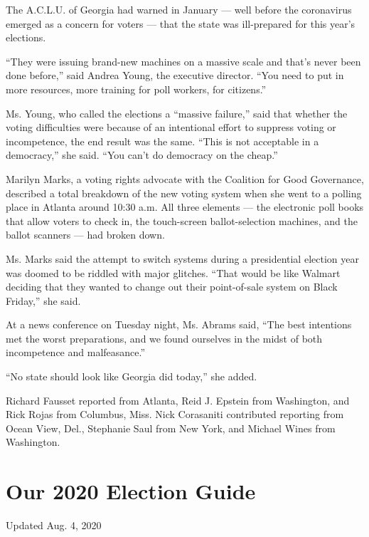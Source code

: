 The A.C.L.U. of Georgia had warned in January --- well before the
coronavirus emerged as a concern for voters --- that the state was
ill-prepared for this year's elections.

``They were issuing brand-new machines on a massive scale and that's
never been done before,'' said Andrea Young, the executive director.
``You need to put in more resources, more training for poll workers, for
citizens.''

Ms. Young, who called the elections a ``massive failure,'' said that
whether the voting difficulties were because of an intentional effort to
suppress voting or incompetence, the end result was the same. ``This is
not acceptable in a democracy,'' she said. ``You can't do democracy on
the cheap.''

Marilyn Marks, a voting rights advocate with the Coalition for Good
Governance, described a total breakdown of the new voting system when
she went to a polling place in Atlanta around 10:30 a.m. All three
elements --- the electronic poll books that allow voters to check in,
the touch-screen ballot-selection machines, and the ballot scanners ---
had broken down.

Ms. Marks said the attempt to switch systems during a presidential
election year was doomed to be riddled with major glitches. ``That would
be like Walmart deciding that they wanted to change out their
point-of-sale system on Black Friday,'' she said.

At a news conference on Tuesday night, Ms. Abrams said, ``The best
intentions met the worst preparations, and we found ourselves in the
midst of both incompetence and malfeasance.''

``No state should look like Georgia did today,'' she added.

Richard Fausset reported from Atlanta, Reid J. Epstein from Washington,
and Rick Rojas from Columbus, Miss. Nick Corasaniti contributed
reporting from Ocean View, Del., Stephanie Saul from New York, and
Michael Wines from Washington.

\hypertarget{our-2020-election-guide}{%
\section{Our 2020 Election Guide}\label{our-2020-election-guide}}

Updated Aug. 4, 2020

